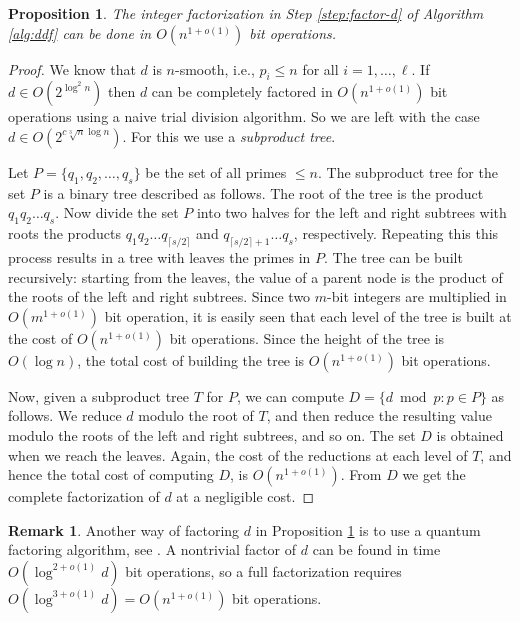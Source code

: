 \documentclass[11pt]{article}
\theoremstyle{plain}
\newtheorem{proposition}[theorem]{Proposition}
\theoremstyle{definition}
\newtheorem*{remark}{Remark}
\begin{document}
\begin{proposition}
	\label{prop:factor-d}
	The integer factorization in Step \ref{step:factor-d} of Algorithm \ref{alg:ddf} can be done in 
	$O(n^{1 + o(1)})$ bit operations.
\end{proposition}
\begin{proof}
	We know that $d$ is $n$-smooth, i.e., $p_i \le n$ for all $i = 1, \dots, \ell$. If $d \in 
	O(2^{\log^2n})$ then $d$ can be completely factored in $O(n^{1 + o(1)})$ bit operations using a 
	naive trial division algorithm. So we are left with the case $d \in O(2^{c\sqrt[3]{n} \log 
	n})$. For this we use a \textit{subproduct tree}.
	
	Let $P = \{ q_1, q_2, \dots, q_s \}$ be the set of all primes $\le n$. The subproduct tree for 
	the set $P$ is a binary tree described as follows. The root of the tree is the product $q_1 q_2 
	\dots q_s$. Now divide the set $P$ into two halves for the left and right subtrees with roots 
	the products $q_1 q_2 \dots q_{\lceil s / 2 \rceil}$ and $q_{\lceil s / 2 \rceil + 1} \dots 
	q_s$, respectively. Repeating this this process results in a tree with leaves the primes in 
	$P$. The tree can be built recursively: starting from the leaves, the value of a parent node 
	is the product of the roots of the left and right subtrees. Since two $m$-bit integers are 
	multiplied in $O(m^{1 + o(1)})$ bit operation, it is easily seen that each level of the tree is 
	built at the cost of $O(n^{1 + o(1)})$ bit operations. Since the height of the tree is 
	$O(\log n)$, the total cost of building the tree is $O(n^{1 + o(1)})$ bit operations.
	
	Now, given a subproduct tree $T$ for $P$, we can compute $D = \{ d \bmod p : p \in P \}$ as 
	follows. We reduce $d$ modulo the root of $T$, and then reduce the resulting value modulo the 
	roots of the left and right subtrees, and so on. The set $D$ is obtained when we reach the 
	leaves. Again, the cost of the reductions at each level of $T$, and hence the total cost of 
	computing $D$, is $O(n^{1 + o(1)})$. From $D$ we get the complete factorization of $d$ at a 
	negligible cost.
\end{proof}
\begin{remark}
	Another way of factoring $d$ in Proposition \ref{prop:factor-d} is to use a quantum factoring 
	algorithm, see \cite{kaye2007introduction}. A nontrivial factor of $d$ can be found in time 
	$O(\log^{2 + o(1)}d)$ bit operations, so a full factorization requires $O(\log^{3 + o(1)}d) 
	= O(n^{1 + o(1)})$ bit operations. 
\end{remark}
\end{document}
